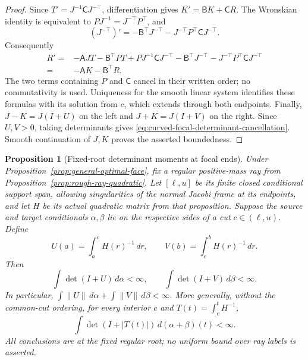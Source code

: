 \documentclass[11pt,reqno]{amsart}
\newtheorem{proposition}[theorem]{Proposition}
\theoremstyle{definition}
\theoremstyle{remark}
\numberwithin{equation}{section}
\begin{document}
\begin{proof}
Since \(T'=J^{-1}\mathsf CJ^{-\top}\), differentiation gives
\(K'=\mathsf BK+\mathsf CR\). The Wronskian identity is equivalent to
\(PJ^{-1}=J^{-\top}P^\top\), and
\[
 (J^{-\top})'=-\mathsf B^\top J^{-\top}
                  -J^{-\top}P^\top\mathsf CJ^{-\top}.
\]
Consequently
\begin{align*}
 R'={}&-\mathsf AJT-\mathsf B^\top PT
       +PJ^{-1}\mathsf CJ^{-\top}
       -\mathsf B^\top J^{-\top}
       -J^{-\top}P^\top\mathsf CJ^{-\top}\\
    ={}&-\mathsf AK-\mathsf B^\top R.
\end{align*}
The two terms containing \(P\) and \(\mathsf C\) cancel in their
written order; no commutativity is used. Uniqueness for the smooth
linear system identifies these formulas with its solution from \(c\),
which extends through both endpoints. Finally,
\(J-K=J(I+U)\) on the left and \(J+K=J(I+V)\) on the right.
Since \(U,V>0\), taking determinants gives
\eqref{eq:curved-focal-determinant-cancellation}. Smooth continuation
of \(J,K\) proves the asserted boundedness.
\end{proof}

\begin{proposition}[Fixed-root determinant moments at focal ends]
\label{prop:curved-focal-determinant-moments}
Under Proposition~\ref{prop:general-optimal-face}, fix a regular
positive-mass ray from Proposition~\ref{prop:rough-ray-quadratic}.
Let \([\ell,u]\) be its finite closed conditional support span,
allowing singularities of the normal Jacobi frame at its endpoints,
and let \(H\) be its actual quadratic matrix from that proposition.
Suppose the source and target conditionals \(\alpha,\beta\) lie on
the respective sides of a cut \(c\in(\ell,u)\). Define
\[
 U(a)=\int_a^c H(r)^{-1}\,dr,\qquad
 V(b)=\int_c^b H(r)^{-1}\,dr.
\]
Then
\[
 \int\det(I+U)\,d\alpha<\infty,\qquad
 \int\det(I+V)\,d\beta<\infty.
\]
In particular, \(\int\|U\|\,d\alpha+\int\|V\|\,d\beta<\infty\).
More generally, without the common-cut ordering, for every interior
\(c\) and \(T(t)=\int_c^t H^{-1}\),
\[
 \int\det(I+|T(t)|)\,d(\alpha+\beta)(t)<\infty.
\]
All conclusions are at the fixed regular root; no uniform bound over
ray labels is asserted.
\end{proposition}
\end{document}
